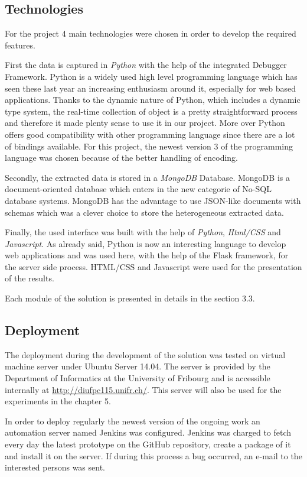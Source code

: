 \subsection{Technologies}
For the project 4 main technologies were chosen in order to develop the required features. 

First the data is captured in \textit{Python} with the help of the integrated Debugger Framework. Python is a widely used high level programming language which has seen these last year an increasing enthusiasm around it, especially for web based applications. Thanks to the dynamic nature of Python, which includes a dynamic type system, the real-time collection of object is a pretty straightforward process and therefore it made plenty sense to use it in our project. More over Python offers good compatibility with other programming language since there are a lot of bindings available. For this project, the newest version 3 of the programming language was chosen because of the better handling of encoding.

Secondly, the extracted data is stored in a \textit{MongoDB} Database. MongoDB is a document-oriented database which enters in the new categorie of No-SQL database systems. MongoDB has the advantage to use JSON-like documents with schemas which was a clever choice to store the heterogeneous extracted data.

Finally, the used interface was built with the help of \textit{Python}, \textit{Html/CSS} and \textit{Javascript}. As already said, Python is now an interesting language to develop web applications and was used here, with the help of the Flask framework, for the server side process. HTML/CSS and Javascript were used for the presentation of the results.

Each module of the solution is presented in details in the section 3.3. 

\subsection{Deployment}
The deployment during the development of the solution was tested on virtual machine server under Ubuntu Server 14.04. The server is provided by the Department of Informatics at the University of Fribourg and is accessible internally at \url{http://diufpc115.unifr.ch/}. This server will also be used for the experiments in the chapter 5. 

In order to deploy regularly the newest version of the ongoing work an automation server named Jenkins was configured. Jenkins was charged to fetch every day the latest prototype on the GitHub repository, create a package of it and install it on the server. If during this process a bug occurred, an e-mail to the interested persons was sent.

